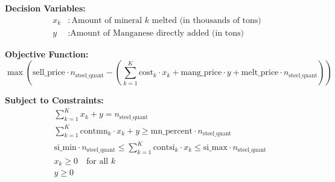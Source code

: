 \documentclass{article}
\begin{document}
\textbf{Decision Variables:}
\begin{align*}
x_k &: \text{Amount of mineral } k \text{ melted (in thousands of tons)} \\
y &: \text{Amount of Manganese directly added (in tons)}
\end{align*}

\textbf{Objective Function:}
\[
\max \left( \text{sell\_price} \cdot n_{\text{steel\_quant}} - \left( \sum_{k=1}^{K} \text{cost}_k \cdot x_k + \text{mang\_price} \cdot y + \text{melt\_price} \cdot n_{\text{steel\_quant}} \right) \right)
\]

\textbf{Subject to Constraints:}
\begin{align*}
&\sum_{k=1}^{K} x_k + y = n_{\text{steel\_quant}} \\
&\sum_{k=1}^{K} \text{contmn}_k \cdot x_k + y \geq \text{mn\_percent} \cdot n_{\text{steel\_quant}} \\
&\text{si\_min} \cdot n_{\text{steel\_quant}} \leq \sum_{k=1}^{K} \text{contsi}_k \cdot x_k \leq \text{si\_max} \cdot n_{\text{steel\_quant}} \\
&x_k \geq 0 \quad \text{for all } k \\
&y \geq 0
\end{align*}
\end{document}
